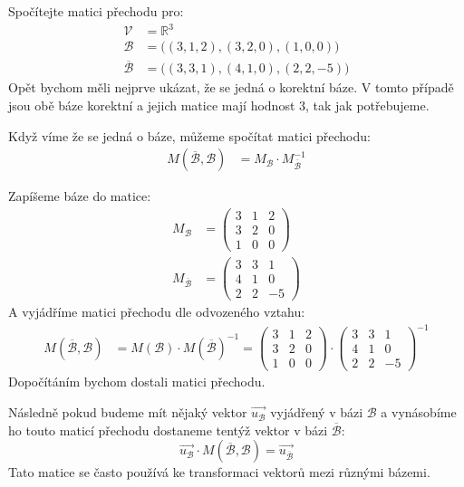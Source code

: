 \begin{example}
    Spočítejte matici přechodu pro:
    \begin{align*}
        \mathcal{V} &= \mathbb{R}^3\\
        \mathcal{B} &= \big ( (3, 1, 2), (3, 2, 0), (1, 0, 0) \big)\\
         \overline{\mathcal{B}} &= \big ( (3, 3, 1), (4, 1, 0), (2, 2, -5) \big)
    \end{align*}
    Opět bychom měli nejprve ukázat, že se jedná o korektní báze. V tomto případě jsou obě
    báze korektní a jejich matice mají hodnost 3, tak jak potřebujeme.

    Když víme že se jedná o báze, můžeme spočítat matici přechodu:
    \begin{align*}
        M(\overline{\mathcal{B}}, \mathcal{B}) &=  M_{\mathcal{B}} \cdot M_{\overline{\mathcal{B}}}^{-1}
    \end{align*}

    Zapíšeme báze do matice:
    \begin{align*}
        M_{\mathcal{B}} & =
        \begin{pmatrix}
            3 & 1 & 2\\
            3 & 2 & 0\\
            1 & 0 & 0
        \end{pmatrix}\\
        M_{\overline{\mathcal{B}}} &=
        \begin{pmatrix}
            3 & 3 & 1\\
            4 & 1 & 0\\
            2 & 2 & -5
        \end{pmatrix}
    \end{align*}
    A vyjádříme matici přechodu dle odvozeného vztahu:
    \begin{align*}
        M(\overline{\mathcal{B}}, \mathcal{B}) &= M(\mathcal{B}) \cdot M(\overline{\mathcal{B}})^{-1} = 
        \begin{pmatrix}
            3 & 1 & 2\\
            3 & 2 & 0\\
            1 & 0 & 0
        \end{pmatrix} \cdot
        \begin{pmatrix}
            3 & 3 & 1\\
            4 & 1 & 0\\
            2 & 2 & -5
        \end{pmatrix} ^ {-1}
    \end{align*}
    Dopočítáním bychom dostali matici přechodu.

    Následně pokud budeme mít nějaký vektor $\vec{u_{\mathcal{B}}}$ vyjádřený v bázi $\mathcal{B}$ a 
    vynásobíme ho touto maticí přechodu dostaneme tentýž vektor v bázi $\overline{\mathcal{B}}$:
    $$\vec{u_{\mathcal{B}}} \cdot M(\overline{\mathcal{B}}, \mathcal{B}) = \vec{u_{\overline{\mathcal{B}}}}$$
    Tato matice se často používá ke transformaci vektorů mezi různými bázemi.
\end{example}

